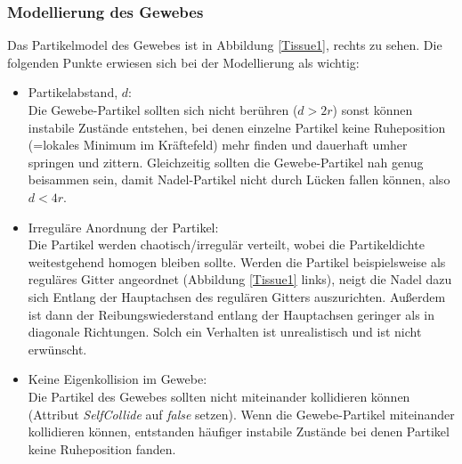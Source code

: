 


\subsubsection{Modellierung des Gewebes}
Das Partikelmodel des Gewebes ist in Abbildung \ref{Tissue1}, rechts zu sehen. Die folgenden Punkte erwiesen sich bei der Modellierung als wichtig:

    \begin{itemize}
    
      \item Partikelabstand, $d$: \\ 
      Die Gewebe-Partikel sollten sich nicht berühren ($d>2r$) sonst können instabile Zustände entstehen, bei denen einzelne Partikel keine Ruheposition (=lokales Minimum im Kräftefeld) mehr finden und dauerhaft umher springen und zittern. Gleichzeitig sollten die Gewebe-Partikel nah genug beisammen sein, damit Nadel-Partikel nicht durch Lücken fallen können, also $d<4r$. 
      
      \item Irreguläre Anordnung der Partikel: \\ 
      Die Partikel werden chaotisch/irregulär verteilt, wobei die Partikeldichte weitestgehend homogen bleiben sollte. Werden die Partikel beispielsweise als reguläres Gitter angeordnet (Abbildung \ref{Tissue1} links), neigt die Nadel dazu sich Entlang der Hauptachsen des regulären Gitters auszurichten. Außerdem ist dann der Reibungswiederstand entlang der Hauptachsen geringer als in diagonale Richtungen. Solch ein Verhalten ist unrealistisch und ist nicht erwünscht.
      
      
      \item Keine Eigenkollision im Gewebe: \\ 
      Die Partikel des Gewebes sollten nicht miteinander kollidieren können (Attribut \textit{SelfCollide} auf \textit{false} setzen). Wenn die Gewebe-Partikel miteinander kollidieren können, entstanden häufiger instabile Zustände bei denen Partikel keine Ruheposition fanden.
      
    \end{itemize}
    
